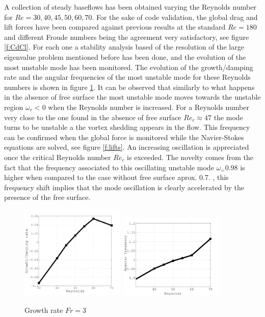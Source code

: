 \documentclass[%
 reprint,
 amsmath,amssymb,
 aps,
prl
]{revtex4-1}
\begin{document}
A collection of steady baseflows has been obtained varying the Reynolds number for $Re=30,40,45,50,60,70$. For the sake of code validation, the global drag and lift forces have been compared against previous results\cite{Bouscasse15} at the standard $Re=180$ and different Froude numbers being the agreement very satisfactory, see figure \ref{f:CdCl}. For each one a stability analysis based of the resolution of the large eigenvalue problem mentioned before has been done, and the evolution of the most unstable mode has been monitored. The evolution of the growth/damping rate and the angular frequencies of the most unstable mode for these Reynolds numbers is shown in figure \ref{f:omegas}. It can be observed that similarly to what happens in the absence of free surface the most unstable mode moves towards the unstable region $\omega_r<0$ when the Reynolds number is increased. For a Reynolds number very close to the one found in the absence of free surface $Re_c\approx 47$ the mode turns to be unstable a the vortex shedding appears in the flow. This frequency can be confirmed when the global force is monitored while the Navier-Stokes equations are solved, see figure \ref{f:lifts}. An increasing oscillation is appreciated once the critical Reynolds number $Re_c$ is exceeded. The novelty comes from the fact that the frequency associated to this oscillating unstable mode $\omega_= 0.98$ is higher when compared to the case without free surface aprox. 0.7. , this frequency shift implies that the mode oscillation is clearly accelerated by the presence of the free surface.


\begin{figure}
  \begin{center}
    \includegraphics[width=5cm]{Growth.pdf}
    \includegraphics[width=5cm]{Freq.pdf}\\
  \end{center}
  \caption{Growth rate $Fr=3$}
  \label{f:omegas}
\end{figure}
\end{document}
